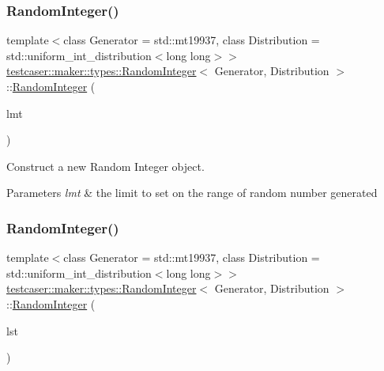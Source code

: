 \subsubsection{\texorpdfstring{RandomInteger()}{RandomInteger()}\hspace{0.1cm}{\footnotesize\ttfamily [2/3]}}
{\footnotesize\ttfamily template$<$class Generator = std\+::mt19937, class Distribution = std\+::uniform\+\_\+int\+\_\+distribution$<$long long$>$$>$ \\
\mbox{\hyperlink{classtestcaser_1_1maker_1_1types_1_1RandomInteger}{testcaser\+::maker\+::types\+::\+Random\+Integer}}$<$ Generator, Distribution $>$\+::\mbox{\hyperlink{classtestcaser_1_1maker_1_1types_1_1RandomInteger}{Random\+Integer}} (\begin{DoxyParamCaption}\item[{\mbox{\hyperlink{classtestcaser_1_1maker_1_1RandomIntegerLimit}{testcaser\+::maker\+::\+Random\+Integer\+Limit}}}]{lmt }\end{DoxyParamCaption})\hspace{0.3cm}{\ttfamily [inline]}}



Construct a new Random Integer object. 


\begin{DoxyParams}{Parameters}
{\em lmt} & the limit to set on the range of random number generated \\
\hline
\end{DoxyParams}
\mbox{\label{classtestcaser_1_1maker_1_1types_1_1RandomInteger_ae126be1bc8d04520b063924e57ccedc6}} 
\subsubsection{\texorpdfstring{RandomInteger()}{RandomInteger()}\hspace{0.1cm}{\footnotesize\ttfamily [3/3]}}
{\footnotesize\ttfamily template$<$class Generator = std\+::mt19937, class Distribution = std\+::uniform\+\_\+int\+\_\+distribution$<$long long$>$$>$ \\
\mbox{\hyperlink{classtestcaser_1_1maker_1_1types_1_1RandomInteger}{testcaser\+::maker\+::types\+::\+Random\+Integer}}$<$ Generator, Distribution $>$\+::\mbox{\hyperlink{classtestcaser_1_1maker_1_1types_1_1RandomInteger}{Random\+Integer}} (\begin{DoxyParamCaption}\item[{std\+::initializer\+\_\+list$<$ long long $>$}]{lst }\end{DoxyParamCaption})\hspace{0.3cm}{\ttfamily [inline]}}



